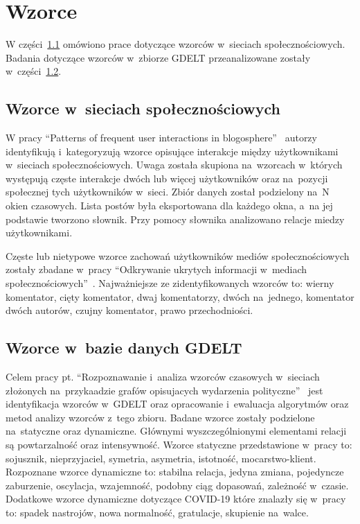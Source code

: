 \documentclass[11pt]{report}
\begin{document}
    \section{Wzorce}\label{sec:wzorce}
    W części~\ref{subsec:wzorce-w-sieciach-społecznościowych} omówiono prace dotyczące wzorców w~sieciach społecznościowych.
    Badania dotyczące wzorców w~zbiorze GDELT przeanalizowane zostały w~części~\ref{subsec:wzorce-gdelt}.

    \subsection{Wzorce w~sieciach społecznościowych}\label{subsec:wzorce-w-sieciach-społecznościowych}
    W pracy ``Patterns of frequent user interactions in blogosphere''~\cite{10.1093/jigpal/jzaa042} autorzy identyfikują i~kategoryzują wzorce opisujące interakcje między użytkownikami w~sieciach społecznościowych.
    Uwaga została skupiona na~wzorcach w~których występują częste interakcje dwóch lub więcej użytkowników oraz na~pozycji społecznej tych użytkowników w~sieci.
    Zbiór danych został podzielony na~N okien czasowych.
    Lista postów była eksportowana dla każdego okna, a~na jej podstawie tworzono słownik.
    Przy pomocy słownika analizowano relacje miedzy użytkownikami.

    Częste lub nietypowe wzorce zachowań użytkowników mediów społecznościowych
    zostały zbadane w~pracy ``Odkrywanie ukrytych informacji w~mediach społecznościowych''~\cite{Skwara2019}.
    Najważniejsze ze zidentyfikowanych wzorców to: wierny komentator, cięty komentator, dwaj komentatorzy, dwóch na~jednego, komentator dwóch autorów, czujny komentator, prawo przechodniości.

    \subsection{Wzorce w~bazie danych GDELT}\label{subsec:wzorce-gdelt}
    Celem pracy pt. ``Rozpoznawanie i~analiza wzorców czasowych w~sieciach złożonych na~przykaadzie grafów opisujacych wydarzenia polityczne''~\cite{Jarosz2020}
    jest identyfikacja wzorców w~GDELT oraz opracowanie i~ewaluacja algorytmów oraz metod analizy wzorców z~tego zbioru.
    Badane wzorce zostały podzielone na~statyczne oraz dynamiczne.
    Głównymi wyszczególnionymi elementami relacji są powtarzalność oraz intensywność.
    Wzorce statyczne przedstawione w~pracy to: sojusznik, nieprzyjaciel, symetria, asymetria, istotność, mocarstwo-klient.
    Rozpoznane wzorce dynamiczne to: stabilna relacja, jedyna zmiana, pojedyncze zaburzenie, oscylacja, wzajemność, podobny ciąg dopasowań, zależność w~czasie.
    Dodatkowe wzorce dynamiczne dotyczące COVID-19 które znalazły się w~pracy to: spadek nastrojów, nowa normalność, gratulacje, skupienie na~walce.
\end{document}
